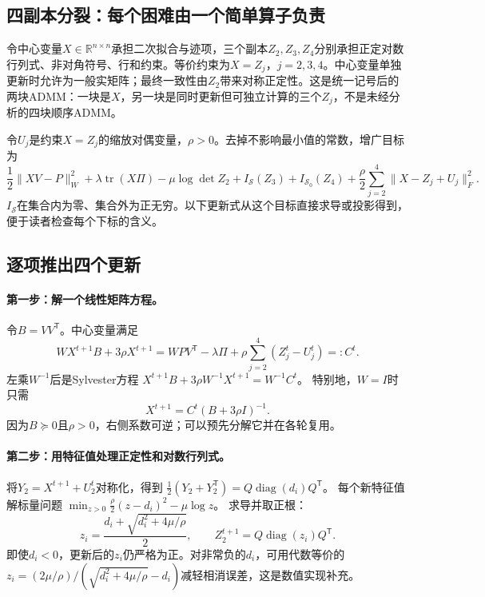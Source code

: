 \documentclass[UTF8,11pt,fontset=fandol,openany,oneside]{ctexbook}
\theoremstyle{definition}
\theoremstyle{remark}
\numberwithin{equation}{chapter}
\begin{document}
\subsection{四副本分裂：每个困难由一个简单算子负责}

令中心变量$X\in\mathbb R^{n\times n}$承担二次拟合与迹项，三个副本$Z_2,Z_3,Z_4$分别承担正定对数行列式、非对角符号、行和约束。等价约束为$X=Z_j$，$j=2,3,4$。中心变量单独更新时允许为一般实矩阵；最终一致性由$Z_2$带来对称正定性。这是统一记号后的两块ADMM：一块是$X$，另一块是同时更新但可独立计算的三个$Z_j$，不是未经分析的四块顺序ADMM。

令$U_j$是约束$X=Z_j$的缩放对偶变量，$\rho>0$。去掉不影响最小值的常数，增广目标为
\[
 \frac12\|XV-P\|_W^2+\lambda\operatorname{tr}(X\Pi)
 -\mu\log\det Z_2+I_{\mathcal S}(Z_3)+I_{\mathcal S_0}(Z_4)
 +\frac\rho2\sum_{j=2}^4\|X-Z_j+U_j\|_F^2.
\]
$I_{\mathcal S}$在集合内为零、集合外为正无穷。以下更新式从这个目标直接求导或投影得到，便于读者检查每个下标的含义。

\subsection{逐项推出四个更新}

\paragraph{第一步：解一个线性矩阵方程。}
令$B=VV^{\mathsf T}$。中心变量满足
\begin{equation}
 WX^{t+1}B+3\rho X^{t+1}
 =WPV^{\mathsf T}-\lambda\Pi+
   \rho\sum_{j=2}^4(Z_j^t-U_j^t)=:C^t.
 \label{eq:tb-P1-X}
\end{equation}
左乘$W^{-1}$后是Sylvester方程
$X^{t+1}B+3\rho W^{-1}X^{t+1}=W^{-1}C^t$。
特别地，$W=I$时只需
\[
 X^{t+1}=C^t(B+3\rho I)^{-1}.
\]
因为$B\succeq0$且$\rho>0$，右侧系数可逆；可以预先分解它并在各轮复用。

\paragraph{第二步：用特征值处理正定性和对数行列式。}
将$Y_2=X^{t+1}+U_2^t$对称化，得到
$\tfrac12(Y_2+Y_2^{\mathsf T})=Q\operatorname{diag}(d_i)Q^{\mathsf T}$。
每个新特征值解标量问题
$\min_{z>0}\frac\rho2(z-d_i)^2-\mu\log z$。
求导并取正根：
\begin{equation}
 z_i=\frac{d_i+\sqrt{d_i^2+4\mu/\rho}}2,\qquad
 Z_2^{t+1}=Q\operatorname{diag}(z_i)Q^{\mathsf T}.
 \label{eq:tb-P1-Z2}
\end{equation}
即使$d_i<0$，更新后的$z_i$仍严格为正。对非常负的$d_i$，可用代数等价的
$z_i=(2\mu/\rho)/(\sqrt{d_i^2+4\mu/\rho}-d_i)$减轻相消误差，这是数值实现补充。
\end{document}
